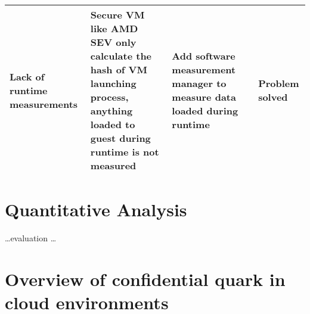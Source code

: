 \begin{table}[h]
\begin{tabular}{  p{3.4cm}  p{3.4cm}  p{3.4cm} p{2cm} }
Lack of runtime measurements
& Secure VM like AMD SEV only calculate the hash of VM launching process, anything loaded to guest during runtime is not measured
& Add software measurement manager to measure data loaded during runtime
& Problem solved  \\\hline



        \bottomrule
    \end{tabular}
\end{table}



\section{Quantitative Analysis}



\ldots evaluation \ldots



\section{Overview of confidential quark in cloud environments}

\cleardoublepage

